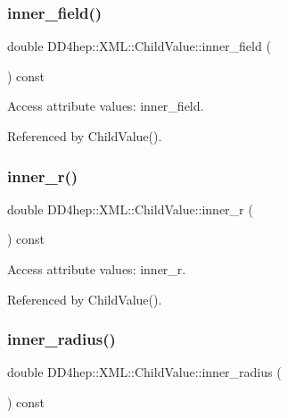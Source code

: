 \subsubsection{\texorpdfstring{inner\+\_\+field()}{inner\_field()}}
{\footnotesize\ttfamily double D\+D4hep\+::\+X\+M\+L\+::\+Child\+Value\+::inner\+\_\+field (\begin{DoxyParamCaption}{ }\end{DoxyParamCaption}) const}



Access attribute values\+: inner\+\_\+field. 



Referenced by Child\+Value().

\hypertarget{struct_d_d4hep_1_1_x_m_l_1_1_child_value_a812c18cc065b413bf0340c94a7a42edc}{}\label{struct_d_d4hep_1_1_x_m_l_1_1_child_value_a812c18cc065b413bf0340c94a7a42edc} 
\subsubsection{\texorpdfstring{inner\+\_\+r()}{inner\_r()}}
{\footnotesize\ttfamily double D\+D4hep\+::\+X\+M\+L\+::\+Child\+Value\+::inner\+\_\+r (\begin{DoxyParamCaption}{ }\end{DoxyParamCaption}) const}



Access attribute values\+: inner\+\_\+r. 



Referenced by Child\+Value().

\hypertarget{struct_d_d4hep_1_1_x_m_l_1_1_child_value_af11c2070dd21b9627cbdebbcc47e1172}{}\label{struct_d_d4hep_1_1_x_m_l_1_1_child_value_af11c2070dd21b9627cbdebbcc47e1172} 
\subsubsection{\texorpdfstring{inner\+\_\+radius()}{inner\_radius()}}
{\footnotesize\ttfamily double D\+D4hep\+::\+X\+M\+L\+::\+Child\+Value\+::inner\+\_\+radius (\begin{DoxyParamCaption}{ }\end{DoxyParamCaption}) const}



